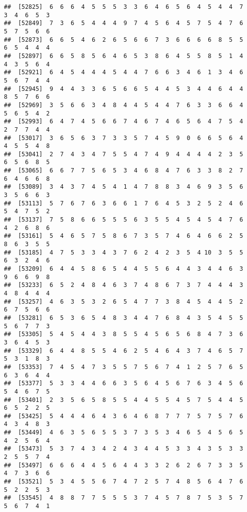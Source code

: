 \documentclass[
]{book}
\begin{document}
\begin{verbatim}
##  [52825]  6  6  6  4  5  5  5  3  3  6  4  6  5  6  4  5  4  4  7  3  4  6  5  3
##  [52849]  7  3  6  5  4  4  4  9  7  4  5  6  4  5  7  5  4  7  6  5  7  5  6  6
##  [52873]  6  6  5  4  6  2  6  5  6  6  7  3  6  6  6  6  8  5  5  6  5  4  4  4
##  [52897]  6  6  5  8  5  6  4  6  5  3  8  6  4  5  5  8  5  1  4  4  3  5  6  4
##  [52921]  6  4  5  4  4  4  5  4  4  7  6  6  3  4  6  1  3  4  6  5  6  7  4  4
##  [52945]  9  4  4  3  3  6  5  6  6  5  4  4  5  3  4  4  6  4  4  8  5  7  6  6
##  [52969]  3  5  6  6  3  4  8  4  4  5  4  4  7  6  3  3  6  6  4  5  6  5  4  2
##  [52993]  6  4  7  4  5  6  6  7  4  6  7  4  6  5  6  4  7  5  4  2  7  7  4  4
##  [53017]  3  6  5  6  3  7  3  3  5  7  4  5  9  0  6  6  5  6  4  4  5  5  4  8
##  [53041]  2  7  4  3  4  7  5  5  4  7  4  9  4  4  4  4  2  3  5  6  5  6  8  5
##  [53065]  6  6  7  7  5  6  5  3  4  6  8  4  7  6  3  3  8  2  7  6  4  6  6  8
##  [53089]  3  4  3  7  4  5  4  1  4  7  8  8  3  4  6  9  3  5  6  3  5  6  6  3
##  [53113]  5  7  6  7  6  3  6  6  1  7  6  4  5  3  2  5  2  4  6  5  4  7  5  2
##  [53137]  7  5  8  6  6  5  5  5  6  3  5  5  4  5  4  5  4  7  6  4  2  6  8  6
##  [53161]  5  4  6  5  7  5  8  6  7  3  5  7  4  6  4  6  6  2  5  8  6  3  5  5
##  [53185]  4  7  5  3  3  4  3  7  6  2  4  2  3  5  4 10  3  5  5  6  3  2  4  6
##  [53209]  6  4  4  5  8  6  5  4  4  5  5  6  4  4  3  4  4  6  3  9  6  6  9  8
##  [53233]  6  5  2  4  8  4  6  3  7  4  8  6  7  3  7  4  4  4  3  4  8  4  4  4
##  [53257]  4  6  3  5  3  2  6  5  4  7  7  3  8  4  5  4  4  5  2  6  7  5  6  6
##  [53281]  6  5  3  6  5  4  8  3  4  4  7  6  8  4  3  5  4  5  5  5  6  7  7  3
##  [53305]  5  4  5  4  4  3  8  5  5  4  5  6  5  6  8  4  7  3  6  3  6  4  5  3
##  [53329]  6  4  4  8  5  5  4  6  2  5  4  6  4  3  7  4  6  5  7  5  3  1  8  3
##  [53353]  7  4  5  4  7  3  5  5  7  5  6  7  4  1  2  5  7  6  5  6  3  6  4  4
##  [53377]  5  3  3  4  4  6  6  3  5  6  4  5  6  7  6  3  4  5  6  5  4  6  7  5
##  [53401]  2  3  5  6  5  8  5  5  4  4  5  5  4  5  7  5  4  4  5  6  5  2  2  5
##  [53425]  5  4  4  4  6  4  3  6  4  6  8  7  7  7  5  7  5  7  6  4  3  4  8  3
##  [53449]  4  6  3  5  6  5  5  3  7  3  5  3  4  6  5  4  5  6  5  4  2  5  6  4
##  [53473]  5  3  7  4  3  4  2  4  3  4  4  5  3  3  4  3  5  3  3  2  5  5  7  4
##  [53497]  6  6  6  4  4  5  6  4  4  3  3  2  6  2  6  7  3  3  5  4  7  3  6  6
##  [53521]  5  3  4  5  5  6  7  4  7  2  5  7  4  8  5  6  4  7  6  5  2  2  5  3
##  [53545]  4  8  8  7  7  5  5  5  3  7  4  5  7  8  7  5  3  5  7  5  6  7  4  1

\end{verbatim}
\end{document}
